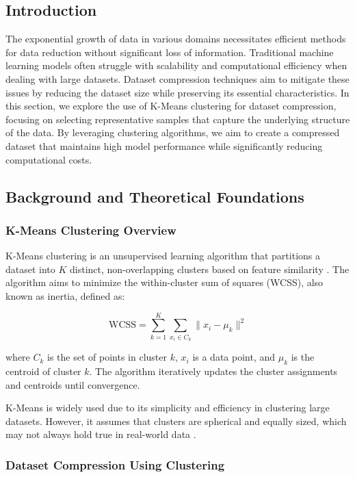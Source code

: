 \documentclass{article}
\begin{document}
\subsection{Introduction}

The exponential growth of data in various domains necessitates efficient methods for data reduction without significant loss of information. Traditional machine learning models often struggle with scalability and computational efficiency when dealing with large datasets. Dataset compression techniques aim to mitigate these issues by reducing the dataset size while preserving its essential characteristics. In this section, we explore the use of K-Means clustering for dataset compression, focusing on selecting representative samples that capture the underlying structure of the data. By leveraging clustering algorithms, we aim to create a compressed dataset that maintains high model performance while significantly reducing computational costs.

\subsection{Background and Theoretical Foundations}

\subsubsection{K-Means Clustering Overview}

K-Means clustering is an unsupervised learning algorithm that partitions a dataset into $K$ distinct, non-overlapping clusters based on feature similarity \cite{lloyd1982least}. The algorithm aims to minimize the within-cluster sum of squares (WCSS), also known as inertia, defined as:

\begin{equation}
\text{WCSS} = \sum_{k=1}^{K} \sum_{x_i \in C_k} \| x_i - \mu_k \|^2
\end{equation}

where $C_k$ is the set of points in cluster $k$, $x_i$ is a data point, and $\mu_k$ is the centroid of cluster $k$. The algorithm iteratively updates the cluster assignments and centroids until convergence.

K-Means is widely used due to its simplicity and efficiency in clustering large datasets. However, it assumes that clusters are spherical and equally sized, which may not always hold true in real-world data \cite{jain2010data}.

\subsubsection{Dataset Compression Using Clustering}
\end{document}
